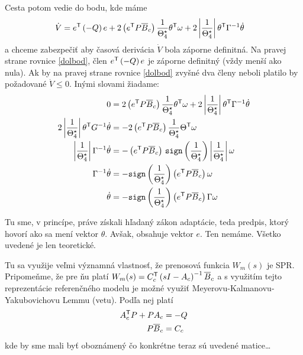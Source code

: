 \documentclass[a4paper, 10pt, ]{article}
\begin{document}
Cesta potom vedie do bodu, kde máme
\begin{align} \label{dolbod}
	\dot{V} &= e^{\mathsf{T}} \left( - Q \right) e + 2 \left( e^{\mathsf{T}} P \overline{B}_c \right) \frac{1}{\Theta_4^\star} \theta^{\mathsf{T}} \omega + 2 \left| \frac{1}{\Theta_4^\star} \right| \theta^{\mathsf{T}} \Gamma^{-1} \dot{\theta}
\end{align}
a chceme zabezpečiť aby časová derivácia $\dot{V}$ bola záporne definitná. Na pravej strane rovnice \eqref{dolbod}, člen $e^{\mathsf{T}} \left( - Q \right) e$ je záporne definitný (vždy menší ako nula). Ak by na pravej strane rovnice \eqref{dolbod} zvyšné dva členy neboli platilo by požadované $\dot{V} \leq 0$. Inými slovami žiadame:
\begin{subequations}
	\begin{align}
    	0 &= 2 \left( e^{\mathsf{T}} P \overline{B}_c \right) \frac{1}{\Theta_4^\star} \theta^{\mathsf{T}} \omega + 2 \left| \frac{1}{\Theta_4^\star} \right| \theta^{\mathsf{T}} \Gamma^{-1} \dot{\theta} \\
    	2 \left| \frac{1}{\Theta_4^\star} \right| \theta^{\mathsf{T}} G^{-1} \dot{\theta} &= - 2 \left( e^{\mathsf{T}} P \overline{B}_c \right) \frac{1}{\Theta_4^\star} \Theta^{\mathsf{T}} \omega \\
    	\left| \frac{1}{\Theta_4^\star} \right| \Gamma^{-1} \dot{\theta} &= - \left( e^{\mathsf{T}} P \overline{B}_c \right) \, \texttt{sign}\left(\frac{1}{\Theta_4^\star}\right) \left| \frac{1}{\Theta_4^\star} \right| \omega \\
    	\Gamma^{-1} \dot{\theta} &= - \texttt{sign}\left(\frac{1}{\Theta_4^\star}\right) \left( e^{\mathsf{T}} P \overline{B}_c \right) \omega \\
    	\dot{\theta} &= - \texttt{sign}\left(\frac{1}{\Theta_4^\star}\right) \left( e^{\mathsf{T}} P \overline{B}_c \right) \Gamma \omega
	\end{align}
\end{subequations}

Tu sme, v princípe, práve získali hľadaný zákon adaptácie, teda predpis, ktorý hovorí ako sa mení vektor $\theta$. Avšak, obsahuje vektor $e$. Ten nemáme. Všetko uvedené je len teoretické.

Tu sa využije veľmi významná vlastnosť, že prenosová funkcia $W_m(s)$ je SPR. Pripomeňme, že pre ňu platí $W_m(s) = C_c^{\mathsf{T}} \left( s I - A_c \right)^{-1} \overline{B}_c$ a s využitím tejto reprezentácie referenčného modelu je možné využiť Meyerovu-Kalmanovu-Yakubovichovu Lemmu (vetu). Podľa nej platí
\begin{align*}
	  A_c^{\mathsf{T}} P + P A_c &= - Q\\
	  P \overline{B}_c &= C_c
\end{align*}
kde by sme mali byť oboznámený čo konkrétne teraz sú uvedené matice\ldots
\end{document}
